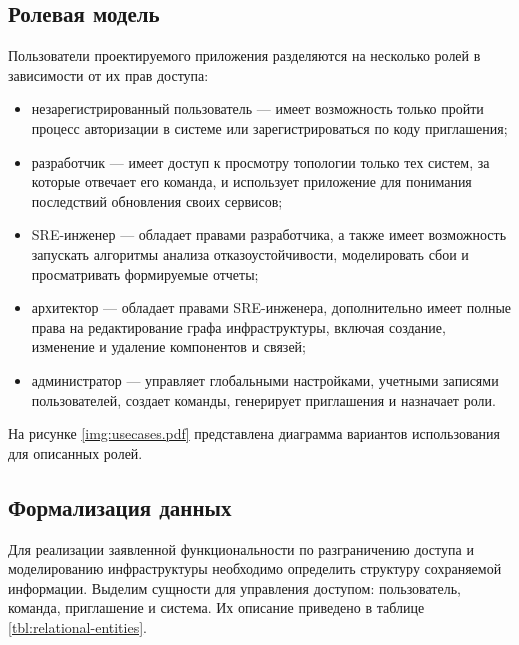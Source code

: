 \subsection{Ролевая модель}
Пользователи проектируемого приложения разделяются на несколько ролей в
зависимости от их прав доступа:
\begin{itemize}
    \item незарегистрированный пользователь --- имеет возможность только пройти
        процесс авторизации в системе или зарегистрироваться по коду приглашения;
    \item разработчик --- имеет доступ к просмотру топологии только тех систем,
        за которые отвечает его команда, и использует приложение для понимания
        последствий обновления своих сервисов;
    \item SRE-инженер --- обладает правами разработчика, а также имеет
        возможность запускать алгоритмы анализа отказоустойчивости,
        моделировать сбои и просматривать формируемые отчеты;
    \item архитектор --- обладает правами SRE-инженера, дополнительно имеет
        полные права на редактирование графа инфраструктуры, включая создание,
        изменение и удаление компонентов и связей;
    \item администратор --- управляет глобальными настройками, учетными
        записями пользователей, создает команды, генерирует приглашения и назначает роли.
\end{itemize}

На рисунке \ref{img:usecases.pdf} представлена диаграмма вариантов
использования для описанных ролей.

\subsection{Формализация данных}
Для реализации заявленной функциональности по разграничению доступа и
моделированию инфраструктуры необходимо определить структуру сохраняемой
информации. Выделим сущности для управления доступом: пользователь, команда,
приглашение и система. Их описание приведено в таблице \ref{tbl:relational-entities}.

